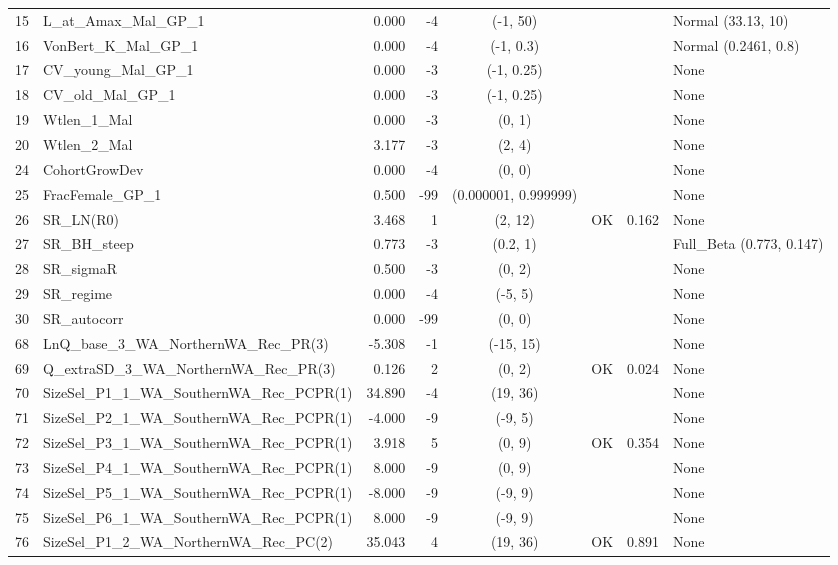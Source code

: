 \documentclass[12pt,]{article}
\begin{document}
\begin{landscape}
\begin{longtable}{rlrrcccl}
  15 & L\_at\_Amax\_Mal\_GP\_1 & 0.000 & -4 & (-1, 50) &  &  & Normal (33.13, 10) \\ 
  16 & VonBert\_K\_Mal\_GP\_1 & 0.000 & -4 & (-1, 0.3) &  &  & Normal (0.2461, 0.8) \\ 
  17 & CV\_young\_Mal\_GP\_1 & 0.000 & -3 & (-1, 0.25) &  &  & None \\ 
  18 & CV\_old\_Mal\_GP\_1 & 0.000 & -3 & (-1, 0.25) &  &  & None \\ 
  19 & Wtlen\_1\_Mal & 0.000 & -3 & (0, 1) &  &  & None \\ 
  20 & Wtlen\_2\_Mal & 3.177 & -3 & (2, 4) &  &  & None \\ 
  24 & CohortGrowDev & 0.000 & -4 & (0, 0) &  &  & None \\ 
  25 & FracFemale\_GP\_1 & 0.500 & -99 & (0.000001, 0.999999) &  &  & None \\ 
  26 & SR\_LN(R0) & 3.468 & 1 & (2, 12) & OK & 0.162 & None \\ 
  27 & SR\_BH\_steep & 0.773 & -3 & (0.2, 1) &  &  & Full\_Beta (0.773, 0.147) \\ 
  28 & SR\_sigmaR & 0.500 & -3 & (0, 2) &  &  & None \\ 
  29 & SR\_regime & 0.000 & -4 & (-5, 5) &  &  & None \\ 
  30 & SR\_autocorr & 0.000 & -99 & (0, 0) &  &  & None \\ 
  68 & LnQ\_base\_3\_WA\_NorthernWA\_Rec\_PR(3) & -5.308 & -1 & (-15, 15) &  &  & None \\ 
  69 & Q\_extraSD\_3\_WA\_NorthernWA\_Rec\_PR(3) & 0.126 & 2 & (0, 2) & OK & 0.024 & None \\ 
  70 & SizeSel\_P1\_1\_WA\_SouthernWA\_Rec\_PCPR(1) & 34.890 & -4 & (19, 36) &  &  & None \\ 
  71 & SizeSel\_P2\_1\_WA\_SouthernWA\_Rec\_PCPR(1) & -4.000 & -9 & (-9, 5) &  &  & None \\ 
  72 & SizeSel\_P3\_1\_WA\_SouthernWA\_Rec\_PCPR(1) & 3.918 & 5 & (0, 9) & OK & 0.354 & None \\ 
  73 & SizeSel\_P4\_1\_WA\_SouthernWA\_Rec\_PCPR(1) & 8.000 & -9 & (0, 9) &  &  & None \\ 
  74 & SizeSel\_P5\_1\_WA\_SouthernWA\_Rec\_PCPR(1) & -8.000 & -9 & (-9, 9) &  &  & None \\ 
  75 & SizeSel\_P6\_1\_WA\_SouthernWA\_Rec\_PCPR(1) & 8.000 & -9 & (-9, 9) &  &  & None \\ 
  76 & SizeSel\_P1\_2\_WA\_NorthernWA\_Rec\_PC(2) & 35.043 & 4 & (19, 36) & OK & 0.891 & None \\ 

\end{longtable}
\end{landscape}
\end{document}
